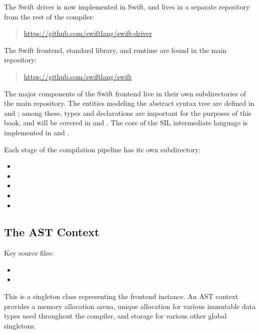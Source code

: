 \documentclass[../generics]{subfiles}
\begin{document}
The Swift driver is now implemented in Swift, and lives in a separate repository from the rest of the compiler:
\begin{quote}
\url{https://github.com/swiftlang/swift-driver}
\end{quote}
The Swift frontend, standard library, and runtime are found in the main repository:
\begin{quote}
\url{https://github.com/swiftlang/swift}
\end{quote}
The major components of the Swift frontend live in their own subdirectories of the main repository. The entities modeling the abstract syntax tree are defined in  and ; among these, types and declarations are important for the purposes of this book, and will be covered in  and . The core of the SIL intermediate language is implemented in  and .

Each stage of the compilation pipeline has its own subdirectory:
\begin{itemize}
\item {}
\item {}
\item {}
\item {}
\item {}
\end{itemize}

\subsection*{The AST Context}
Key source files:
\begin{itemize}
\item {}
\item {}
\end{itemize}

This is a singleton class representing the frontend instance. An AST context provides a memory allocation arena, unique allocation for various immutable data types used throughout the compiler, and storage for various other global singletons.
\end{document}
